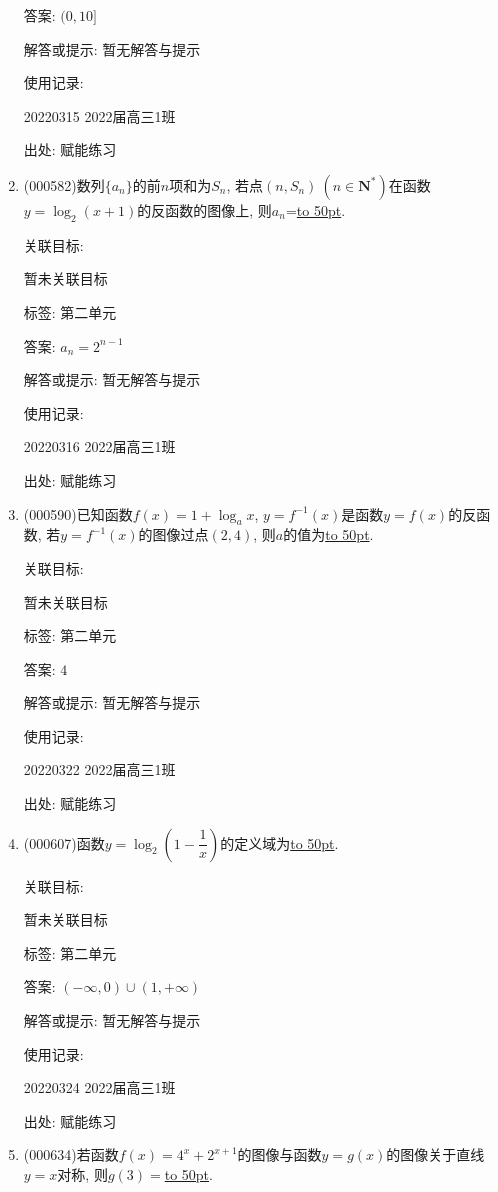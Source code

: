 \documentclass[10pt,a4paper]{article}
\newcommand{\blank}[1]{\underline{\hbox to #1pt{}}}
\begin{document}
\begin{enumerate}[1.]
答案: $(0,10 ]$

解答或提示: 暂无解答与提示

使用记录:

20220315	2022届高三1班	


出处: 赋能练习
\item { (000582)}数列$\{a_n\}$的前$n$项和为$S_n$, 若点$(n,S_n) \ (n\in \mathbf{N}^*)$在函数$y=\log_2 (x+1)$的反函数的图像上, 则$a_n$=\blank{50}.


关联目标:

暂未关联目标



标签: 第二单元

答案: $a_n=2^{n-1}$

解答或提示: 暂无解答与提示

使用记录:

20220316	2022届高三1班	


出处: 赋能练习
\item { (000590)}已知函数$f(x)=1+\log_a x$, $y=f^{-1}(x)$是函数$y=f(x)$的反函数, 若$y=f^{-1}(x)$的图像过点$(2,4)$, 则$a$的值为\blank{50}.


关联目标:

暂未关联目标



标签: 第二单元

答案: $4$

解答或提示: 暂无解答与提示

使用记录:

20220322	2022届高三1班	


出处: 赋能练习
\item { (000607)}函数$y=\log_2(1-\dfrac1x)$的定义域为\blank{50}.


关联目标:

暂未关联目标



标签: 第二单元

答案: $(-\infty ,0)\cup (1,+\infty)$

解答或提示: 暂无解答与提示

使用记录:

20220324	2022届高三1班	


出处: 赋能练习
\item { (000634)}若函数$f(x)=4^x+2^{x+1}$的图像与函数$y=g(x)$的图像关于直线$y=x$对称, 则$g(3)=$\blank{50}.



\end{enumerate}
\end{document}
